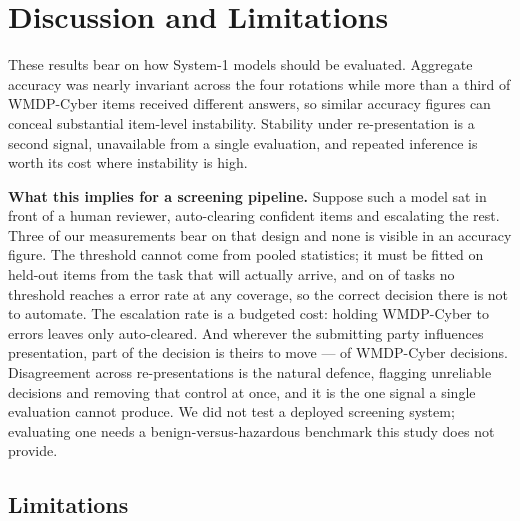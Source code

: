 \documentclass[conference]{IEEEtran}
\begin{document}
\section{Discussion and Limitations}

These results bear on how System-1 models should be evaluated. Aggregate accuracy was
nearly invariant across the four rotations while more than a third of WMDP-Cyber items
received different answers, so similar accuracy figures can conceal substantial item-level
instability. Stability under re-presentation is a second signal, unavailable from a single
evaluation, and repeated inference is worth its cost where instability is high.

\textbf{What this implies for a screening pipeline.} Suppose such a model sat in front of a
human reviewer, auto-clearing confident items and escalating the rest. Three of our
measurements bear on that design and none is visible in an accuracy figure. The threshold
cannot come from pooled statistics; it must be fitted on held-out items from the task that
will actually arrive, and on \statThrNUnachievable{} of \statThrNDatasets{} tasks no
threshold reaches a \statThrTarget{} error rate at any coverage, so the correct decision
there is not to automate. The escalation rate is a budgeted cost: holding WMDP-Cyber to
\statThrTarget{} errors leaves only \statThrCovCyber{} auto-cleared. And wherever the
submitting party influences presentation, part of the decision is theirs to move ---
\statAtkSteerRotCyber{} of WMDP-Cyber decisions. Disagreement across re-presentations is
the natural defence, flagging unreliable decisions and removing that control at once, and
it is the one signal a single evaluation cannot produce. We did not test a deployed
screening system; evaluating one needs a benign-versus-hazardous benchmark this study does
not provide.

\subsection{Limitations}
\end{document}
